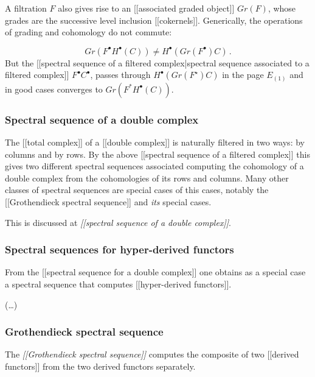 \documentclass[12pt,titlepage]{article}
\theoremstyle{plain}
\theoremstyle{definition}
\theoremstyle{remark}
\begin{document}
A filtration $F$ also gives rise to an [[associated graded object]] $Gr(F)$, whose grades are the successive level inclusion [[cokernels]]. Generically, the operations of grading and cohomology do not commute:

\begin{displaymath}
Gr(F^\bullet H^\bullet(C)) \neq H^\bullet (Gr(F^\bullet) C)
  \,.
\end{displaymath}
But the [[spectral sequence of a filtered complex|spectral sequence associated to a filtered complex]] $F^\bullet C^\bullet$, passes through $H^\bullet (Gr(F^\star) C)$ in the page $E_{(1)}$ and in good cases converges to $Gr(F^* H^\bullet(C))$.

\hypertarget{SpectralSequenceOfADoubleComplex}{}\subsubsection*{{Spectral sequence of a double complex}}\label{SpectralSequenceOfADoubleComplex}

The [[total complex]] of a [[double complex]] is naturally filtered in two ways: by columns and by rows. By the above [[spectral sequence of a filtered complex]] this gives two different spectral sequences associated computing the cohomology of a double complex from the cohomologies of its rows and columns. Many other classes of spectral sequences are special cases of this cases, notably the [[Grothendieck spectral sequence]] and \emph{its} special cases.

This is discussed at \emph{[[spectral sequence of a double complex]]}.

\hypertarget{HyperDerivedFunctors}{}\subsubsection*{{Spectral sequences for hyper-derived functors}}\label{HyperDerivedFunctors}

From the [[spectral sequence for a double complex]] one obtains as a special case a spectral sequence that computes [[hyper-derived functors]].

(\ldots{})

\hypertarget{GrothendieckSpectralSequence}{}\subsubsection*{{Grothendieck spectral sequence}}\label{GrothendieckSpectralSequence}

The \emph{[[Grothendieck spectral sequence]]} computes the composite of two [[derived functors]] from the two derived functors separately.
\end{document}
